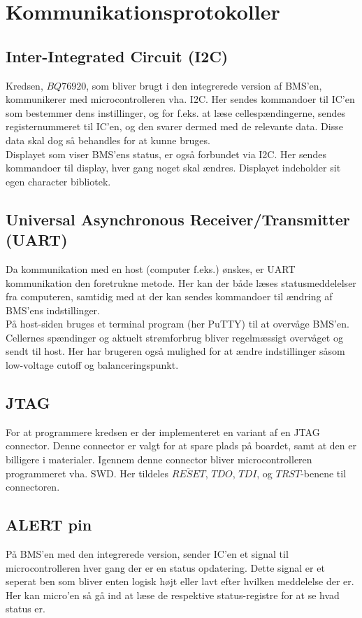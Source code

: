 \section{Kommunikationsprotokoller}

\subsection{Inter-Integrated Circuit (I2C)}
Kredsen, $BQ76920$, som bliver brugt i den integrerede version af BMS'en, kommunikerer med microcontrolleren vha. I2C. Her sendes kommandoer til IC'en som bestemmer dens instillinger, og for f.eks. at læse cellespændingerne, sendes registernummeret til IC'en, og den svarer dermed med de relevante data. Disse data skal dog så behandles for at kunne bruges. \\

Displayet som viser BMS'ens status, er også forbundet via I2C. Her sendes kommandoer til display, hver gang noget skal ændres. Displayet indeholder sit egen character bibliotek. 

\subsection{Universal Asynchronous Receiver/Transmitter (UART)}
Da kommunikation med en host (computer f.eks.) ønskes, er UART kommunikation den foretrukne metode. Her kan der både læses statusmeddelelser fra computeren, samtidig med at der kan sendes kommandoer til ændring af BMS'ens indstillinger. \\

På host-siden bruges et terminal program (her PuTTY) til at overvåge BMS'en. Cellernes spændinger og aktuelt strømforbrug bliver regelmæssigt overvåget og sendt til host. Her har brugeren også mulighed for at ændre indstillinger såsom low-voltage cutoff og balanceringspunkt. 

\subsection{JTAG}
For at programmere kredsen er der implementeret en variant af en JTAG connector. Denne connector er valgt for at spare plads på boardet, samt at den er billigere i materialer. Igennem denne connector bliver microcontrolleren programmeret vha. SWD. Her tildeles $\overline{RESET}$, $TDO$, $TDI$, og $TRST$-benene til connectoren. 

\subsection{ALERT pin}
På BMS'en med den integrerede version, sender IC'en et signal til microcontrolleren hver gang der er en status opdatering. Dette signal er et seperat ben som bliver enten logisk højt eller lavt efter hvilken meddelelse der er. Her kan micro'en så gå ind at læse de respektive status-registre for at se hvad status er. 

